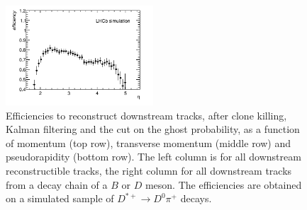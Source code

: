 \begin{figure}[tbph]
\begin{center}
\includegraphics[width =0.49\textwidth]{figures/EffPatLLT/overall/DstD0piFromBDEta_TBTC.png}
\caption{Efficiencies to reconstruct downstream tracks, after clone killing, Kalman filtering and the cut on the ghost probability, as a function of momentum (top row), transverse momentum (middle row) and pseudorapidity (bottom row). The left column is for all downstream reconstructible tracks, the right column for all downstream tracks from a decay chain of a $B$ or $D$ meson. The efficiencies are obtained on a simulated sample of $D^{*+} \rightarrow D^{0}\pi^+$ decays.}
\label{fig:EffPatLLTDstD0p_TBTCi}
 \end{center}
 \end{figure}


